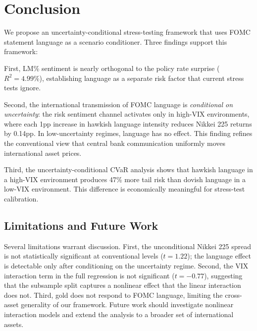 \documentclass[11pt]{article}
\begin{document}
\section{Conclusion}

We propose an uncertainty-conditional stress-testing framework that uses FOMC statement language as a scenario conditioner. Three findings support this framework:

First, LM\% sentiment is nearly orthogonal to the policy rate surprise ($R^2 = 4.99\%$), establishing language as a separate risk factor that current stress tests ignore.

Second, the international transmission of FOMC language is \textit{conditional on uncertainty}: the risk sentiment channel activates only in high-VIX environments, where each 1pp increase in hawkish language intensity reduces Nikkei 225 returns by 0.14pp. In low-uncertainty regimes, language has no effect. This finding refines the conventional view that central bank communication uniformly moves international asset prices.

Third, the uncertainty-conditional CVaR analysis shows that hawkish language in a high-VIX environment produces 47\% more tail risk than dovish language in a low-VIX environment. This difference is economically meaningful for stress-test calibration.

\subsection{Limitations and Future Work}

Several limitations warrant discussion. First, the unconditional Nikkei 225 spread is not statistically significant at conventional levels ($t = 1.22$); the language effect is detectable only after conditioning on the uncertainty regime. Second, the VIX interaction term in the full regression is not significant ($t = -0.77$), suggesting that the subsample split captures a nonlinear effect that the linear interaction does not. Third, gold does not respond to FOMC language, limiting the cross-asset generality of our framework. Future work should investigate nonlinear interaction models and extend the analysis to a broader set of international assets.


\end{document}
